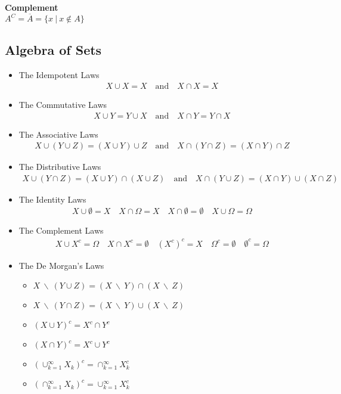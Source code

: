 \documentclass{article}
\numberwithin{theorem}{subsection}
\numberwithin{theorem}{subsubsection}
\theoremstyle{definition}
\numberwithin{definition}{subsection}
\numberwithin{definition}{subsubsection}
\begin{document}
\noindent \textbf{Complement} \\
\indent $A^{C} = \overline{A} = \{x\ |\ x \notin A\}$ \\

\subsection{Algebra of Sets}
\begin{itemize}
    \item The Idempotent Laws 
    \begin{gather*}
        X \cup X = X \quad \text{and} \quad X \cap X = X
    \end{gather*}
    \item The Commutative Laws
    \begin{gather*}
        X \cup Y = Y \cup X \quad \text{and} \quad X \cap Y = Y \cap X
    \end{gather*}
    \item The Associative Laws
    \begin{gather*}
        X \cup (Y \cup Z) = (X \cup Y) \cup Z \quad \text{and} \quad X \cap (Y \cap Z) = (X \cap Y) \cap Z
    \end{gather*}
    \item The Distributive Laws
    \begin{gather*}
        X \cup (Y \cap Z) = (X \cup Y) \cap (X \cup Z) \quad \text{and} \quad X \cap (Y \cup Z) = (X \cap Y) \cup (X \cap Z)
    \end{gather*}
    \item{The Identity Laws}
    \begin{gather*}
        X \cup \emptyset = X \quad X \cap \Omega = X \quad X \cap \emptyset = \emptyset \quad X \cup \Omega = \Omega
    \end{gather*}
    \item{The Complement Laws}
    \begin{gather*}
        X \cup X^{c} = \Omega \quad X \cap X^{c} = \emptyset \quad (X^{c})^{c} = X \quad \Omega^{c} = \emptyset \quad \emptyset^{c} = \Omega
    \end{gather*}
    \item{The De Morgan's Laws}
    \begin{itemize}
        \item $X\ \backslash \ (Y \cup Z) = (X\ \backslash \ Y) \cap (X\ \backslash\  Z)$
        \item $X\ \backslash \ (Y \cap Z) = (X\ \backslash\ Y) \cup (X\ \backslash\ Z)$
        \item $(X \cup Y)^{c} = X^{c} \cap Y^{c}$
        \item $(X \cap Y)^{c} = X^{c} \cup Y^{c}$
        \item $(\cup_{k=1}^{\infty}X_{k})^{c} = \cap_{k=1}^{\infty}X_{k}^{c}$
        \item $(\cap_{k=1}^{\infty}X_{k})^{c} = \cup_{k=1}^{\infty}X_{k}^{c}$
    \end{itemize}
    
\end{itemize}
\end{document}
